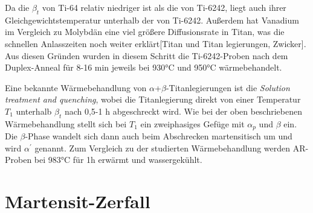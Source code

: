 Da die $\beta_{t}$ von Ti-64 relativ niedriger ist als die von Ti-6242, liegt auch ihrer Gleichgewichtstemperatur unterhalb der von Ti-6242. Außerdem hat Vanadium im Vergleich zu Molybdän eine viel größere Diffusionsrate in Titan, was die schnellen Anlasszeiten noch weiter erklärt[Titan und Titan legierungen, Zwicker]. Aus diesen Gründen wurden in diesem Schritt die Ti-6242-Proben nach dem Duplex-Anneal für 8-16 min jeweils bei 930°C und 950°C wärmebehandelt.

Eine bekannte Wärmebehandlung von $\alpha$+$\beta$-Titanlegierungen ist die  \textit{Solution treatment and quenching}, wobei die Titanlegierung direkt von einer Temperatur $T_{1}$ unterhalb  $\beta_{t}$ nach 0,5-1 h abgeschreckt wird. Wie bei der oben beschriebenen Wärmebehandlung stellt sich bei $T_{1}$ ein zweiphasiges Gefüge mit $\alpha_p$ und $\beta$ ein. Die $\beta$-Phase wandelt sich  dann auch beim Abschrecken martensitisch um und wird $\alpha^\prime$ genannt.
Zum Vergleich zu der studierten Wärmebehandlung werden AR-Proben bei 983°C für 1h erwärmt und wassergekühlt.

\section{Martensit-Zerfall}